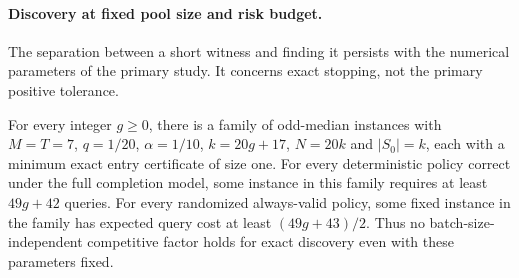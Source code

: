 \paragraph{Discovery at fixed pool size and risk budget.}
The separation between a short witness and finding it persists with the numerical parameters of the primary study. It concerns exact stopping, not the primary positive tolerance.
\begin{proposition}
\label{prop:fixed-discovery}
For every integer $g\ge0$, there is a family of odd-median instances with $M=T=7$, $q=1/20$, $\alpha=1/10$, $k=20g+17$, $N=20k$ and $|S_0|=k$, each with a minimum exact entry certificate of size one. For every deterministic policy correct under the full completion model, some instance in this family requires at least $49g+42$ queries. For every randomized always-valid policy, some fixed instance in the family has expected query cost at least $(49g+43)/2$. Thus no batch-size-independent competitive factor holds for exact discovery even with these parameters fixed.
\end{proposition}
